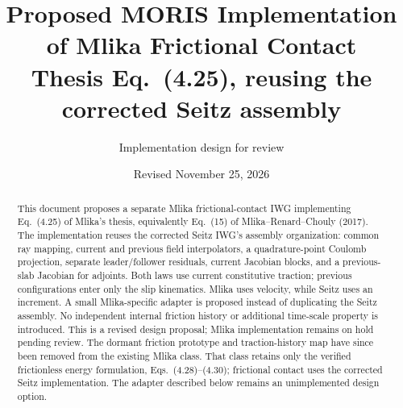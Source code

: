 \documentclass[11pt,a4paper]{article}
\title{Proposed MORIS Implementation of Mlika Frictional Contact\\
\large Thesis Eq.~(4.25), reusing the corrected Seitz assembly}
\author{Implementation design for review}
\date{Revised November 25, 2026}
\begin{document}
\maketitle

\begin{abstract}
This document proposes a separate Mlika frictional-contact IWG implementing
Eq.~(4.25) of Mlika's thesis, equivalently Eq.~(15) of
Mlika--Renard--Chouly (2017). The implementation reuses the corrected Seitz
IWG's assembly organization: common ray mapping, current and previous field
interpolators, a quadrature-point Coulomb projection, separate leader/follower
residuals, current Jacobian blocks, and a previous-slab Jacobian for adjoints.
Both laws use current constitutive traction; previous configurations enter only
the slip kinematics. Mlika uses velocity, while Seitz uses an increment. A small
Mlika-specific adapter is proposed instead of duplicating the Seitz assembly.
No independent internal friction history or additional time-scale property is
introduced. This is a revised design proposal; Mlika implementation remains on
hold pending review. The dormant friction prototype and traction-history map
have since been removed from the existing Mlika class. That class retains only
the verified frictionless energy formulation, Eqs.~(4.28)--(4.30); frictional
contact uses the corrected Seitz implementation. The adapter described below
remains an unimplemented design option.
\end{abstract}
\clearpage
\tableofcontents
\clearpage
\end{document}
